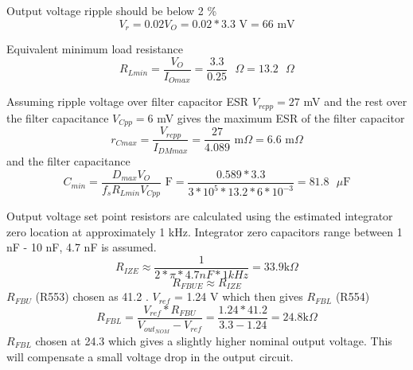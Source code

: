 Output voltage ripple should be below 2 \%
\begin{equation}
V_r=0.02V_O = 0.02*3.3 \text{ V} = 66 \text{ mV}
\end{equation}

Equivalent minimum load resistance
\begin{equation}
R_{Lmin}=\frac{V_O}{I_{Omax}} = \frac{3.3}{0.25} \text{ $\Omega$} =
13.2 \text{ $\Omega$}
\end{equation}

Assuming ripple voltage over filter capacitor ESR $V_{rcpp}=27$ mV and
the rest over the filter capacitance $V_{Cpp}=6$ mV gives the maximum
ESR of the filter capacitor
\begin{equation}
r_{Cmax} = \frac{V_{rcpp}}{I_{DMmax}} =
\frac{27}{4.089} \text{ m$\Omega$} = 6.6 \text{ m$\Omega$}
\end{equation}
and the filter capacitance
\begin{equation}
C_{min} = \frac{D_{max}V_O}{f_sR_{Lmin}V_{Cpp}} \text{ F} =
\frac{0.589*3.3}{3*10^5*13.2*6*10^{-3}} = 81.8 \text{ $\mu$F}
\end{equation}


Output voltage set point resistors are calculated using the estimated
integrator zero location at approximately 1 kHz. Integrator zero
capacitors range between 1 nF - 10 nF, 4.7 nF is assumed.
\begin{equation}
R_{IZE} \approx \frac{1}{2* \pi * 4.7 nF * 1 kHz} =
33.9 \text{k$\Omega$}
\end{equation}
\begin{equation}
R_{FBUE} \approx R_{IZE}
\end{equation}
$R_{FBU}$ (R553) chosen as 41.2 . $V_{ref}$ = 1.24 V
which then gives $R_{FBL}$ (R554)
\begin{equation}
R_{FBL} = \frac{V_{ref}*R_{FBU}}{V_{out_{NOM}} - V_{ref}}
= \frac{1.24*41.2}{3.3-1.24} = 24.8 \text{k$\Omega$}
\end{equation}
$R_{FBL}$ chosen at 24.3  which gives a slightly
higher nominal output voltage. This will compensate a small voltage drop
in the output circuit.

